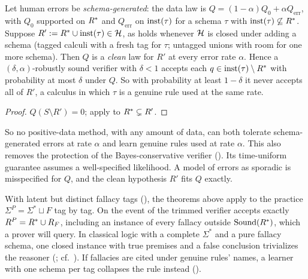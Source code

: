 \begin{corollary}\label{cor:imitation:systematic}
Let human errors be \emph{schema-generated}: the data law is $Q=(1-\alpha)Q_0+\alpha Q_{\mathrm{err}}$, with $Q_0$ supported on $R^{*}$ and $Q_{\mathrm{err}}$ on $\mathrm{inst}(\tau)$ for a schema $\tau$ with $\mathrm{inst}(\tau)\not\subseteq R^{*}$. Suppose $R':=R^{*}\cup\mathrm{inst}(\tau)\in\mathcal{H}$, as holds whenever $\mathcal{H}$ is closed under adding a schema (tagged calculi with a fresh tag for $\tau$; untagged unions with room for one more schema). Then $Q$ is a \emph{clean} law for $R'$ at every error rate $\alpha$. Hence a $(\delta,\alpha)$-robustly sound verifier with $\delta<1$ accepts each $q\in\mathrm{inst}(\tau)\setminus R^{*}$ with probability at most $\delta$ under $Q$. So with probability at least $1-\delta$ it never accepts all of $R'$, a calculus in which $\tau$ is a genuine rule used at the same rate.
\end{corollary}

\begin{proof}
$Q(S\setminus R')=0$; apply  to $R^{*}\subsetneq R'$.
\end{proof}

So no positive-data method, with any amount of data, can both tolerate schema-generated errors at rate $\alpha$ and learn genuine rules used at rate $\alpha$. This also removes the protection of the Bayes-conservative verifier (). Its time-uniform guarantee assumes a well-specified likelihood. A model of errors as sporadic is misspecified for $Q$, and the clean hypothesis $R'$ fits $Q$ exactly.

\begin{remark}\label{rem:imitation:practice}
With latent but distinct fallacy tags (), the theorems above apply to the practice $\Sigma^P=\Sigma^*\sqcup F$ tag by tag. On the event of  the trimmed verifier accepts exactly $R^P=R^{*}\cup R_F$, including an instance of every fallacy outside $\mathrm{Sound}(R^{*})$, which a prover will query. In classical logic with a complete $\Sigma^*$ and a pure fallacy schema, one closed instance with true premises and a false conclusion trivializes the reasoner (; cf.\ ). If fallacies are cited under genuine rules' names, a learner with one schema per tag collapses the rule instead ().
\end{remark}

